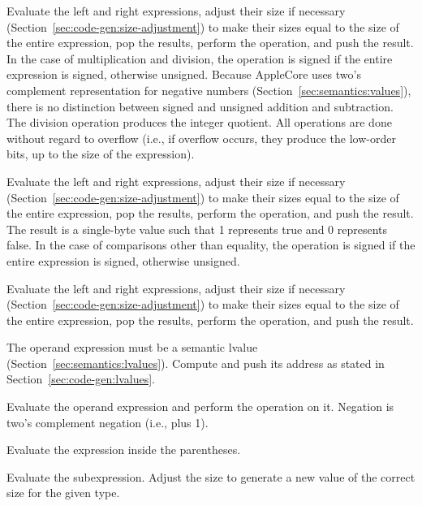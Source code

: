 \documentclass[10pt]{article}
\begin{document}
 Evaluate the left and right expressions, adjust their
size if necessary (Section~\ref{sec:code-gen:size-adjustment}) to make
their sizes equal to the size of the entire expression, pop the
results, perform the operation, and push the result.  In the case of
multiplication and division, the operation is signed if the entire
expression is signed, otherwise unsigned.  Because AppleCore uses
two's complement representation for negative numbers
(Section~\ref{sec:semantics:values}), there is no distinction between
signed and unsigned addition and subtraction.  The division operation
produces the integer quotient.  All operations are done without regard
to overflow (i.e., if overflow occurs, they produce the low-order
bits, up to the size of the expression).

 Evaluate the left and right expressions, adjust
their size if necessary (Section~\ref{sec:code-gen:size-adjustment})
to make their sizes equal to the size of the entire expression, pop
the results, perform the operation, and push the result.  The result
is a single-byte value such that 1 represents true and 0 represents
false.  In the case of comparisons other than equality, the operation
is signed if the entire expression is signed, otherwise unsigned.

Evaluate the left and right expressions, adjust their size if
necessary (Section~\ref{sec:code-gen:size-adjustment}) to make their
sizes equal to the size of the entire expression, pop the results,
perform the operation, and push the result.

 
The operand expression must be a semantic lvalue
(Section~\ref{sec:semantics:lvalues}).  Compute and push its address
as stated in Section~\ref{sec:code-gen:lvalues}.

Evaluate the operand expression and perform the operation on it.
Negation is two's complement negation (i.e.,  plus 1).

 Evaluate the expression inside the
parentheses.

 Evaluate the subexpression.  Adjust the
size to generate a new value of the correct size for the given type.
\end{document}
